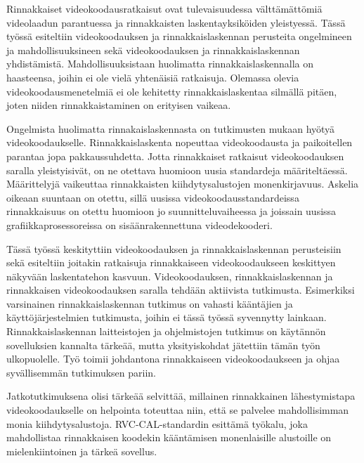 Rinnakkaiset videokoodausratkaisut ovat tulevaisuudessa välttämättömiä
videolaadun parantuessa ja rinnakkaisten laskentayksiköiden yleistyessä.
Tässä työssä esiteltiin videokoodauksen ja rinnakkaislaskennan perusteita
ongelmineen ja mahdollisuuksineen sekä videokoodauksen ja rinnakkaislaskennan
yhdistämistä. Mahdollisuuksistaan huolimatta rinnakkaislaskennalla on
haasteensa, joihin ei ole vielä yhtenäisiä ratkaisuja. Olemassa olevia
videokoodausmenetelmiä ei ole kehitetty rinnakkaislaskentaa silmällä pitäen,
joten niiden rinnakkaistaminen on erityisen vaikeaa.

Ongelmista huolimatta rinnakaislaskennasta on tutkimusten mukaan hyötyä
videokoodaukselle. Rinnakkaislaskenta nopeuttaa videokoodausta ja paikoitellen
parantaa jopa pakkaussuhdetta. Jotta rinnakkaiset ratkaisut videokoodauksen
saralla yleistyisivät, on ne otettava huomioon uusia standardeja
määriteltäessä. Määrittelyjä vaikeuttaa rinnakkaisten kiihdytysalustojen
monenkirjavuus. Askelia oikeaan suuntaan on otettu, sillä uusissa
videokoodausstandardeissa rinnakkaisuus on otettu huomioon jo
suunnitteluvaiheessa ja joissain uusissa grafiikkaprosessoreissa on
sisäänrakennettuna videodekooderi.

Tässä työssä keskityttiin videokoodauksen ja rinnakkaislaskennan perusteisiin
sekä esiteltiin joitakin ratkaisuja rinnakkaiseen videokoodaukseen keskittyen
näkyvään laskentatehon kasvuun. Videokoodauksen, rinnakkaislaskennan ja
rinnakkaisen videokoodauksen saralla tehdään aktiivista tutkimusta. Esimerkiksi
varsinainen rinnakkaislaskennan tutkimus on vahasti kääntäjien ja
käyttöjärjestelmien tutkimusta, joihin ei tässä työssä syvennytty lainkaan.
Rinnakkaislaskennan laitteistojen ja ohjelmistojen tutkimus on käytännön
sovelluksien kannalta tärkeää, mutta yksityiskohdat jätettiin tämän työn ulkopuolelle.
Työ toimii johdantona rinnakkaiseen videokoodaukseen ja ohjaa syvällisemmän
tutkimuksen pariin.

Jatkotutkimuksena olisi tärkeää selvittää, millainen rinnakkainen
lähestymistapa videokoodaukselle on helpointa toteuttaa niin, että se
palvelee mahdollisimman monia kiihdytysalustoja. RVC-CAL-standardin esittämä
työkalu, joka mahdollistaa rinnakkaisen koodekin kääntämisen monenlaisille
alustoille on mielenkiintoinen ja tärkeä sovellus. 


